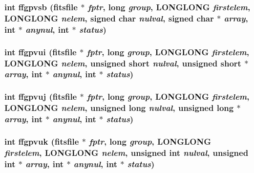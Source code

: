 \subsubsection{\setlength{\rightskip}{0pt plus 5cm}int ffgpvsb (\bf{fitsfile} $\ast$ {\em fptr}, long {\em group}, \bf{LONGLONG} {\em firstelem}, \bf{LONGLONG} {\em nelem}, signed char {\em nulval}, signed char $\ast$ {\em array}, int $\ast$ {\em anynul}, int $\ast$ {\em status})}\label{test_2shm__client_2fitsio_8h_c16f3f63bcf3165ea08e680e0cf19f3a}


\subsubsection{\setlength{\rightskip}{0pt plus 5cm}int ffgpvui (\bf{fitsfile} $\ast$ {\em fptr}, long {\em group}, \bf{LONGLONG} {\em firstelem}, \bf{LONGLONG} {\em nelem}, unsigned short {\em nulval}, unsigned short $\ast$ {\em array}, int $\ast$ {\em anynul}, int $\ast$ {\em status})}\label{test_2shm__client_2fitsio_8h_6f7dc3a158e748e6a3d31615a8ba9816}


\subsubsection{\setlength{\rightskip}{0pt plus 5cm}int ffgpvuj (\bf{fitsfile} $\ast$ {\em fptr}, long {\em group}, \bf{LONGLONG} {\em firstelem}, \bf{LONGLONG} {\em nelem}, unsigned long {\em nulval}, unsigned long $\ast$ {\em array}, int $\ast$ {\em anynul}, int $\ast$ {\em status})}\label{test_2shm__client_2fitsio_8h_d3a92390525cbe896595a5e30e2c31cb}


\subsubsection{\setlength{\rightskip}{0pt plus 5cm}int ffgpvuk (\bf{fitsfile} $\ast$ {\em fptr}, long {\em group}, \bf{LONGLONG} {\em firstelem}, \bf{LONGLONG} {\em nelem}, unsigned int {\em nulval}, unsigned int $\ast$ {\em array}, int $\ast$ {\em anynul}, int $\ast$ {\em status})}\label{test_2shm__client_2fitsio_8h_9d63a49944e89d4debca1080067ca58f}


